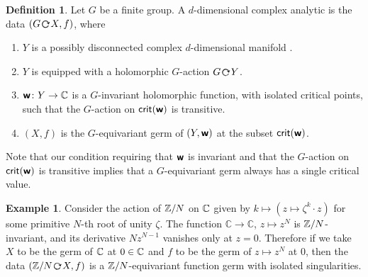 \documentclass[twoside,leqno]{article}
\numberwithin{equation}{section}
\theoremstyle{plain}
\theoremstyle{definition}
\newtheorem{definition}[equation]{Definition}
\newtheorem{example}[equation]{Example}
\begin{document}
\begin{definition}\label{def:G-equivariant isolated singularity} Let $G$ be a finite group. 
A $d$-dimensional complex analytic   is the data $\left(G \, \actleft \, X,f\right)$, where
\begin{enumerate}[wide]
    \item $Y$ is a possibly disconnected complex $d$-dimensional manifold .
    \item $Y$ is equipped with a holomorphic $G$-action $G\, \actleft \, Y$.
    \item $\boldsymbol{\mathsf{w}} \colon  Y \to \mathbb C$ is a $G$-invariant holomorphic function, with isolated critical points, such that the $G$-action on $\mathsf{crit}(\boldsymbol{\mathsf{w}})$ is transitive.
    \item $(X,f)$ is the $G$-equivariant germ of $(Y,\boldsymbol{\mathsf{w}})$ at the subset $\mathsf{crit}(\boldsymbol{\mathsf{w}})$.
\end{enumerate}
\end{definition}

Note that our condition requiring that $\boldsymbol{\mathsf{w}}$ is invariant and that the $G$-action on $\mathsf{crit}(\boldsymbol{\mathsf{w}})$ is transitive implies that a $G$-equivariant germ always has a single critical value.

\begin{example}
Consider the action of $\mathbb Z/N$ on $\mathbb C$  given  by  $k \mapsto (z \mapsto \zeta^{k}\cdot z)$ for some primitive $N$-th root of unity $\zeta$. The function
$\mathbb{C} \to \mathbb{C}$, $z \mapsto z^N$
is $\mathbb Z/N$-invariant, and its derivative $Nz^{N-1}$ vanishes only at $z=0$. 
Therefore if we take 
$X$ to be the germ of  $\mathbb C$ at $0 \in \mathbb C$ and $f$ to be the  germ of $z \mapsto z^N$ at $0$, then the data $\left({\bbZ/N}\, \actleft \, X,f \right)$  is a $\mathbb Z/N$-equivariant function germ with isolated singularities.
\end{example}
\end{document}
